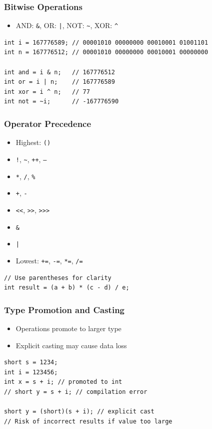 \documentclass[serif, aspectratio=169]{beamer}
\begin{document}
\begin{frame}[fragile]
\frametitle{Bitwise Operations}
\begin{itemize}
    \item AND: \texttt{\&}, OR: \texttt{|}, NOT: \texttt{\~}, XOR: \texttt{\^}
\end{itemize}
\begin{lstlisting}
int i = 167776589; // 00001010 00000000 00010001 01001101
int n = 167776512; // 00001010 00000000 00010001 00000000

int and = i & n;   // 167776512
int or = i | n;    // 167776589  
int xor = i ^ n;   // 77
int not = ~i;      // -167776590
\end{lstlisting}
\end{frame}

\begin{frame}[fragile]
\frametitle{Operator Precedence}
\begin{itemize}
    \item Highest: \texttt{()}
    \item \texttt{!}, \texttt{\~}, \texttt{++}, \texttt{--}
    \item \texttt{*}, \texttt{/}, \texttt{\%}
    \item \texttt{+}, \texttt{-}
    \item \texttt{<<}, \texttt{>>}, \texttt{>>>}
    \item \texttt{\&}
    \item \texttt{|}
    \item Lowest: \texttt{+=}, \texttt{-=}, \texttt{*=}, \texttt{/=}
\end{itemize}
\begin{lstlisting}
// Use parentheses for clarity
int result = (a + b) * (c - d) / e;
\end{lstlisting}
\end{frame}

\begin{frame}[fragile]
\frametitle{Type Promotion and Casting}
\begin{itemize}
    \item Operations promote to larger type
    \item Explicit casting may cause data loss
\end{itemize}
\begin{lstlisting}
short s = 1234;
int i = 123456;
int x = s + i; // promoted to int
// short y = s + i; // compilation error

short y = (short)(s + i); // explicit cast
// Risk of incorrect results if value too large
\end{lstlisting}
\end{frame}
\end{document}
